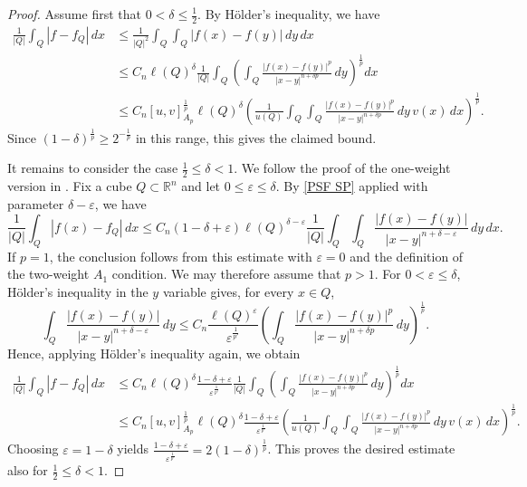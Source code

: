 \documentclass[reqno, 10pt, oneside]{amsart}
\numberwithin{equation}{section}
\numberwithin{theorem}{section}
\newcommand{\R}{{\mathbb R}}
\newcommand{\1}{{\rm 1\hspace*{-0.4ex}%
\rule{0.1ex}{1.52ex}\hspace*{0.2ex}}}
\begin{document}
\begin{proof}
Assume first that $0<\delta\le \frac12$. By H\"older's inequality, we have
\begin{align*}
    \frac{1}{|Q|}\int_Q |f-f_Q|\,dx
    &\le \frac{1}{|Q|^2}\int_Q\int_Q |f(x)-f(y)|\,dy\,dx \\
    &\le C_n\ell(Q)^\delta \frac{1}{|Q|}\int_Q \left(\int_Q \frac{|f(x)-f(y)|^p}{|x-y|^{n+\delta p}}\,dy\right)^{\frac{1}{p}} dx \\
    &\le C_n [u,v]_{A_p}^{\frac{1}{p}}\ell(Q)^\delta\left(\frac{1}{u(Q)}\int_Q\int_Q \frac{|f(x)-f(y)|^p}{|x-y|^{n+\delta p}}\,dy\,v(x)\,dx\right)^{\frac{1}{p}} .
\end{align*}
Since $(1-\delta)^{\frac{1}{p}}\ge 2^{-\frac{1}{p}}$ in this range, this gives the claimed bound.

   It remains to consider the case $\frac12\le \delta<1$. We follow the proof of the one-weight version in \cite[Corollary 5.2]{MPW}. Fix a cube $Q\subset \R^n$ and let $0\le \varepsilon\le \delta$. By \eqref{PSF SP} applied with parameter $\delta-\varepsilon$, we have
\begin{equation*}
    \frac{1}{|Q|}\int_Q |f(x)-f_Q|\,dx \le C_n(1-\delta+\varepsilon)\ell(Q)^{\delta-\varepsilon}\frac{1}{|Q|}\int_Q\int_Q \frac{|f(x)-f(y)|}{|x-y|^{n+\delta-\varepsilon}}\,dy\,dx .
\end{equation*}
If $p=1$, the conclusion follows from this estimate with $\varepsilon=0$ and the definition of the two-weight $A_1$ condition. We may therefore assume that $p>1$. For $0<\varepsilon\le \delta$, H\"older's inequality in the $y$ variable gives, for every $x\in Q$,
\begin{equation*}
    \int_Q \frac{|f(x)-f(y)|}{|x-y|^{n+\delta-\varepsilon}}\,dy \le C_n\frac{\ell(Q)^\varepsilon}{\varepsilon^{\frac{1}{p'}}}\left(\int_Q \frac{|f(x)-f(y)|^p}{|x-y|^{n+\delta p}}\,dy\right)^{\frac{1}{p}} .
\end{equation*}
Hence, applying H\"older's inequality again, we obtain
\begin{align*}
    \frac{1}{|Q|}\int_Q |f-f_Q|\,dx
    &\le C_n\ell(Q)^\delta\frac{1-\delta+\varepsilon}{\varepsilon^{\frac{1}{p'}}}\frac{1}{|Q|}\int_Q \left(\int_Q \frac{|f(x)-f(y)|^p}{|x-y|^{n+\delta p}}\,dy\right)^{\frac{1}{p}} dx \\
    &\le C_n [u,v]_{A_p}^{\frac{1}{p}}\ell(Q)^\delta\frac{1-\delta+\varepsilon}{\varepsilon^{\frac{1}{p'}}}\left(\frac{1}{u(Q)}\int_Q\int_Q \frac{|f(x)-f(y)|^p}{|x-y|^{n+\delta p}}\,dy\,v(x)\,dx\right)^{\frac{1}{p}} .
\end{align*}
Choosing $\varepsilon=1-\delta$ yields $\frac{1-\delta+\varepsilon}{\varepsilon^{\frac{1}{p'}}}=2(1-\delta)^{\frac{1}{p}}$. This proves the desired estimate also for $\frac12\le \delta<1$.
\end{proof}
\end{document}
